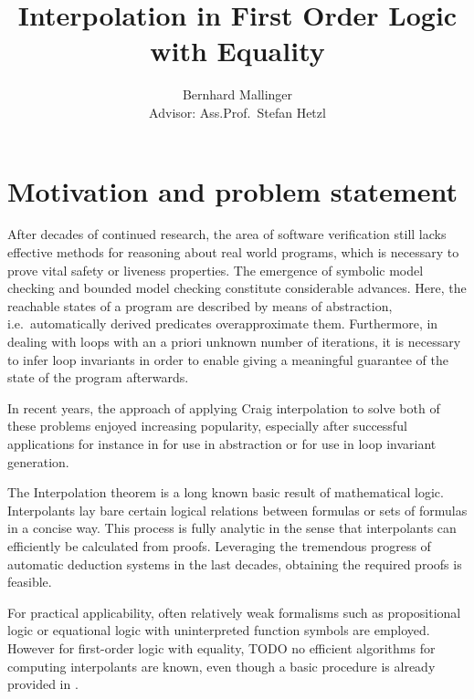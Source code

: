 \documentclass[,%
			paper=a4,%
			DIV12,
			liststotoc,
			bibtotoc,
			draft=false,%
			numbers=noendperiod
			]{scrartcl}
\title{Interpolation in First Order Logic with Equality}
\author{Bernhard Mallinger \medskip \\
Advisor: Ass.Prof.\ Stefan Hetzl}
\theoremstyle{definition}
\begin{document}
\maketitle

\section{Motivation and problem statement}
\label{motivation}

After decades of continued research, the area of software verification still lacks effective methods for reasoning about real world programs, which is necessary to prove vital safety or liveness properties.
The emergence of symbolic model checking and bounded model checking constitute considerable advances.
Here, the reachable states of a program are described by means of abstraction, i.e.\ automatically derived predicates overapproximate them. 
Furthermore, in dealing with loops with an a priori unknown number of iterations, it is necessary to infer loop invariants in order to enable giving a meaningful guarantee of the state of the program afterwards.

In recent years, the approach of applying Craig interpolation to solve both of these problems enjoyed increasing popularity, especially after successful applications for instance in \cite{McMillan03} for use in abstraction or \cite{weissenbacher2010} for use in loop invariant generation.

The Interpolation theorem is a long known basic result of mathematical logic.
Interpolants lay bare certain logical relations between formulas or sets of formulas in a concise way. 
This process is fully analytic in the sense that interpolants can efficiently be calculated from proofs.
Leveraging the tremendous progress of automatic deduction systems in the last decades, obtaining the required proofs is feasible.

For practical applicability, often relatively weak formalisms such as propositional logic or equational logic with uninterpreted function symbols are employed.
However for first-order logic with equality, TODO no efficient algorithms for computing interpolants are known, even though a basic procedure is already provided in \cite{craig57linear}.


\begin{comment}
Software verification
Model checking
Derive invariants
interpolation by its nature disregards all but the predicates relevant to a certain property
can be used for predicate refinement in cegar

often restricted to weaker logics, application to more powerful formalisms such as fol with equality is relevant 
\end{comment}
\end{document}
